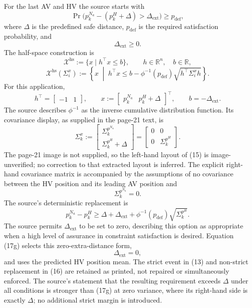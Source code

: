 \documentclass{article}
\begin{document}
For the last AV and HV the source starts with
\begin{equation}
\Pr\bigl(p_k^{N_a}-(p_k^H+\Delta)>\Delta_{\mathrm{ext}}\bigr)
 \geq p_{\mathrm{def}},\tag{13}
\end{equation}
where $\Delta$ is the predefined safe distance, $p_{\mathrm{def}}$ is the required satisfaction probability, and
\[
\Delta_{\mathrm{ext}}\geq0.
\]
The half-space construction is
\[
\mathcal X^{\mathrm{hs}}:=\{x\mid h^\top x\leq b\},\qquad
h\in\mathbb R^n,\quad b\in\mathbb R,
\]
\begin{equation}
\mathcal X^{\mathrm{hs}}(\Sigma_i^x):=
\left\{x\;\middle|\;h^\top x\leq b-\phi^{-1}(p_{\mathrm{def}})
 \sqrt{h^\top\Sigma_i^x h}\right\}.\tag{14}
\end{equation}
For this application,
\[
h^\top=\begin{bmatrix}-1&1\end{bmatrix},\qquad
x:=\begin{bmatrix}p_k^{N_a}&p_k^H+\Delta\end{bmatrix}^{\!\top},\qquad
b=-\Delta_{\mathrm{ext}}.
\]
The source describes $\phi^{-1}$ as the inverse cumulative distribution function. Its covariance display, as supplied in the page-21 text, is
\begin{equation}
\Sigma_k^x:=
\begin{bmatrix}\Sigma_k^{p^{N_a}}\\ \Sigma_k^{p^H}+\Delta\end{bmatrix}
=\begin{bmatrix}0&0\\0&\Sigma_k^{p^H}\end{bmatrix}.\tag{15}
\end{equation}
The page-21 image is not supplied, so the left-hand layout of (15) is image-unverified; no correction to that extracted layout is inferred. The explicit right-hand covariance matrix is accompanied by the assumptions of no covariance between the HV position and its leading AV position and
\[
\Sigma_k^{p^{N_a}}=0.
\]
The source's deterministic replacement is
\begin{equation}
p_k^{N_a}-p_k^H\geq\Delta+\Delta_{\mathrm{ext}}
 +\phi^{-1}(p_{\mathrm{def}})\sqrt{\Sigma_k^{p^H}}.\tag{16}
\end{equation}
The source permits $\Delta_{\mathrm{ext}}$ to be set to zero, describing this option as appropriate when a high level of assurance in constraint satisfaction is desired. Equation (17g) selects this zero-extra-distance form,
\[
\Delta_{\mathrm{ext}}=0,
\]
and uses the predicted HV position mean. The strict event in (13) and non-strict replacement in (16) are retained as printed, not repaired or simultaneously enforced. The source's statement that the resulting requirement exceeds $\Delta$ under all conditions is stronger than (17g) at zero variance, where its right-hand side is exactly $\Delta$; no additional strict margin is introduced.
\end{document}
